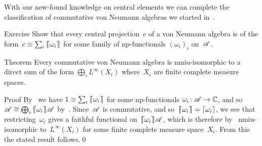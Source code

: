 \documentclass[a]{subfiles}
\begin{document}
\begin{parsec}%
\begin{point}%
With our new-found knowledge on central elements
we can complete the classification
of commutative von Neumann algebras
we started in~.
\end{point}
\begin{point}{Exercise}%
Show that every central projection~$c$
of a von Neumann algebra is of
the form~$c\equiv \sum_i \left\lceil\!\!\left\lceil\omega_i\right\rceil\!\!\right\rceil$
for some family of np-functionals $(\omega_i)_i$ on~$\mathscr{A}$.
\end{point}
\begin{point}[cvn]{Theorem}%
Every commutative von Neumann algebra
is nmiu-isomorphic
to a direct sum of the form  $\bigoplus_i L^\infty(X_i)$
where~$X_i$ are finite complete measure spaces.
\begin{point}{Proof}%
By~
we have $1\equiv \sum_i \left\lceil\!\!\left\lceil\omega_i\right\rceil\!\!\right\rceil $
for some np-functionals $\omega_i\colon \mathscr{A}\to\mathbb{C}$,
and so~$\mathscr{A}\cong \bigoplus_i \left\lceil\!\!\left\lceil\omega_i\right\rceil\!\!\right\rceil\!\mathscr{A}$
by~.
Since~$\mathscr{A}$ is commutative,
and so~$\left\lceil\!\!\left\lceil\omega_i\right\rceil\!\!\right\rceil=\left\lceil\omega_i\right\rceil$,
we see that restricting~$\omega_i$
gives a faithful functional on~$\left\lceil\!\!\left\lceil\omega_i\right\rceil\!\!\right\rceil\!\mathscr{A}$,
which is therefore by~ nmiu-isomorphic to~$L^\infty(X_i)$
for some finite complete measure space~$X_i$.
From this the stated result follows.\qed
\end{point}
\end{point}
\end{parsec}
\end{document}
